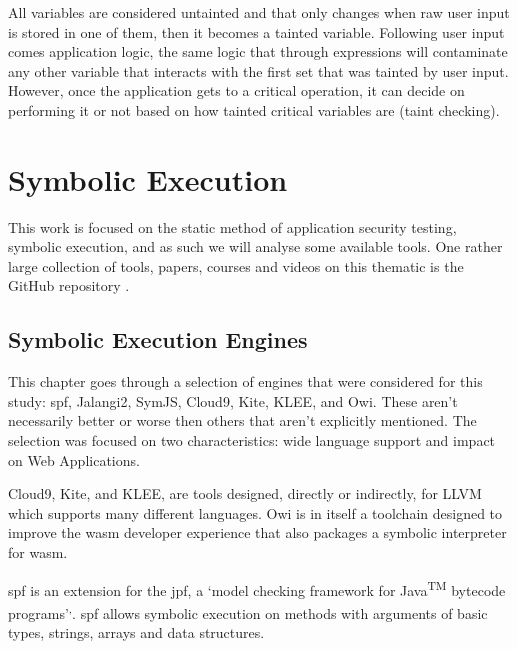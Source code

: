 All variables are considered untainted and that only changes when raw user input is stored in one of them, then it becomes a tainted variable. Following user input comes application logic, the same logic that through expressions will contaminate any other variable that interacts with the first set that was tainted by user input. However, once the application gets to a critical operation, it can decide on performing it or not based on how tainted critical variables are  (taint checking).

\section{Symbolic Execution}

This work is focused on the static method of application security testing, symbolic execution, and as such we will analyse some available tools. One rather large collection of tools, papers, courses and videos on this thematic is the GitHub repository .

\subsection{Symbolic Execution Engines}\label{subsection:symbolic_exec_engines}

This chapter goes through a selection of engines that were considered for this study: \acrlong{spf}, Jalangi2, SymJS, Cloud9, Kite, KLEE, and Owi. These aren't necessarily better or worse then others that aren't explicitly mentioned. The selection was focused on two characteristics: wide language support and impact on Web Applications. 

Cloud9, Kite, and KLEE, are tools designed, directly or indirectly, for LLVM which supports many different languages. Owi is in itself a toolchain designed to improve the \acrshort{wasm} developer experience that also packages a symbolic interpreter for \acrlong{wasm}.


\newcommand{\setool}[1]{\noindent{\large\textbf{\textit{#1}}}\par}

\setool{\acrfull{spf}}
\acrlong{spf} is an extension for the \acrfull{jpf}, a `model checking framework for Java\textsuperscript{TM} bytecode programs'\textsuperscript{,}. \acrshort{spf} allows symbolic execution on methods with arguments of basic types, strings, arrays and data structures\footnotemark[2].%

